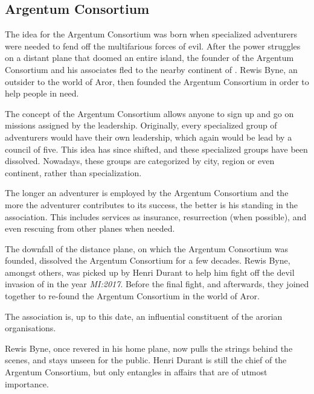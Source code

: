 \subsection{Argentum Consortium}
\label{sec:Argentum Consortium}

The idea for the Argentum Consortium was born when specialized adventurers were
needed to fend off the multifarious forces of evil. After the power struggles on
a distant plane that doomed an entire island, the founder of the Argentum
Consortium and his associates fled to the nearby continent of
. Rewis Byne, an outsider to the world of Aror, then
founded the Argentum Consortium in order to help people in need.

The concept of the Argentum Consortium allows anyone to sign up and go on
missions assigned by the leadership. Originally, every specialized group of
adventurers would have their own leadership, which again would be lead by a
council of five. This idea has since shifted, and these specialized groups have
been dissolved. Nowadays, these groups are categorized by city, region or even
continent, rather than specialization.

The longer an adventurer is employed by the Argentum Consortium and the more the
adventurer contributes to its success, the better is his standing in the
association. This includes services as insurance, resurrection (when possible),
and even rescuing from other planes when needed.

The downfall of the distance plane, on which the Argentum Consortium was
founded, dissolved the Argentum Consortium for a few decades. Rewis Byne,
amongst others, was picked up by Henri Durant to help him fight off the devil
invasion of  in the year \emph{MI:2017}. Before the final
fight, and afterwards, they joined together to re-found the Argentum
Consortium in the world of Aror.

The association is, up to this date, an influential constituent of the arorian
organisations.

Rewis Byne, once revered in his home plane, now pulls the strings behind the
scenes, and stays unseen for the public. Henri Durant is still the chief of the
Argentum Consortium, but only entangles in affairs that are of utmost
importance.

